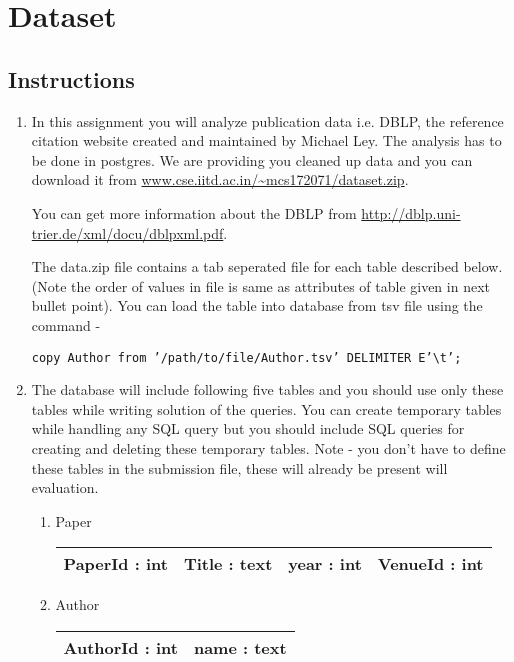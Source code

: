 \documentclass[10pt]{article}
\begin{document}
\section{Dataset}

\subsection{Instructions}

\begin{enumerate}

\item In this assignment you will analyze publication data i.e. DBLP, the reference citation website created and maintained by Michael Ley. The analysis has to  be done in postgres. We are providing you cleaned up data and you can download it from \url{www.cse.iitd.ac.in/~mcs172071/dataset.zip}. 

You can get more information about the DBLP from \url{http://dblp.uni-trier.de/xml/docu/dblpxml.pdf}. 

The data.zip file contains a tab seperated file for each table described below.(Note the order of values in file is same as attributes of table given in next bullet point). You can load the table into database from tsv file using the command - 

{\tt copy Author from '/path/to/file/Author.tsv' DELIMITER E'\textbackslash t';}

\item The database will include following five tables and you should use only these tables while writing solution of the queries. You can create temporary tables while handling any SQL query but you should include SQL queries for creating and deleting these temporary tables. Note - you don't have to define these tables in the submission file, these will already be present will evaluation.


\begin{enumerate}
\item Paper\\
        \begin{tabular}{|c|c|c|c|}
            \hline
             PaperId : int & Title : text & year : int & VenueId : int\\
            \hline
        \end{tabular}
\item Author\\
        \begin{tabular}{|c|c|}
            \hline 
             AuthorId : int & name : text \\
            \hline
        \end{tabular}


\end{enumerate}
\end{enumerate}
\end{document}
